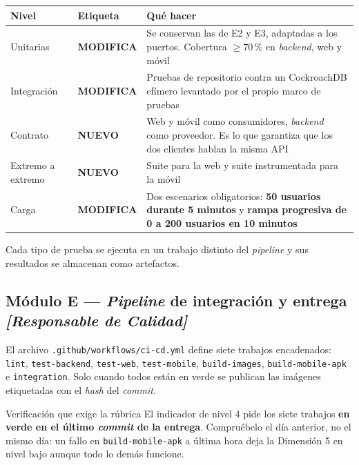 \documentclass[11pt,a4paper]{article}
\newcommand{\cambia}{\cellcolor{filaCambia}\textbf{MODIFICA}}
\newcommand{\nuevo}{\cellcolor{filaNuevo}\textbf{NUEVO}}
\begin{document}
\begin{center}
	\footnotesize
	\begin{tabular}{@{}p{2.5cm}p{1.6cm}p{10.4cm}@{}}
		\toprule
		\textbf{Nivel} & \textbf{Etiqueta} & \textbf{Qué hacer} \\
		\midrule
		Unitarias & \cambia & Se conservan las de E2 y E3, adaptadas a los puertos. Cobertura $\geq 70\,\%$ en \emph{backend}, web y móvil \\
		\addlinespace
		Integración & \cambia & Pruebas de repositorio contra un CockroachDB efímero levantado por el propio marco de pruebas \\
		\addlinespace
		Contrato & \nuevo & Web y móvil como consumidores, \emph{backend} como proveedor. Es lo que garantiza que los dos clientes hablan la misma API \\
		\addlinespace
		Extremo a extremo & \nuevo & Suite para la web y suite instrumentada para la móvil \\
		\addlinespace
		Carga & \cambia & Dos escenarios obligatorios: \textbf{50 usuarios durante 5 minutos} y \textbf{rampa progresiva de 0 a 200 usuarios en 10 minutos} \\
		\bottomrule
	\end{tabular}
\end{center}

Cada tipo de prueba se ejecuta en un trabajo distinto del \emph{pipeline} y sus resultados se almacenan como artefactos.

\subsection{Módulo E --- \emph{Pipeline} de integración y entrega \emph{[Responsable de Calidad]}}

El archivo \texttt{.github/workflows/ci-cd.yml} define siete trabajos encadenados: \texttt{lint}, \texttt{test-backend}, \texttt{test-web}, \texttt{test-mobile}, \texttt{build-images}, \texttt{build-mobile-apk} e \texttt{integration}. Solo cuando todos están en verde se publican las imágenes etiquetadas con el \emph{hash} del \emph{commit}.

\begin{avisoBox}{Verificación que exige la rúbrica}
	El indicador de nivel 4 pide los siete trabajos \textbf{en verde en el último \emph{commit} de la entrega}. Compruébelo el día anterior, no el mismo día: un fallo en \texttt{build-mobile-apk} a última hora deja la Dimensión 5 en nivel bajo aunque todo lo demás funcione.
\end{avisoBox}
\end{document}
